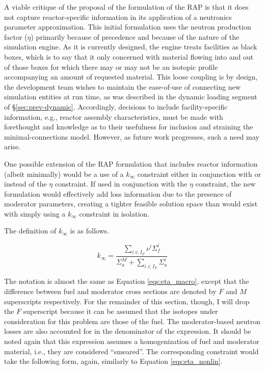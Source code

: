 A viable critique of the proposal of the formulation of the RAP is that it does
not capture reactor-specific information in its application of a neutronics
parameter approximation. This initial formulation uses the neutron production
factor ($\eta$) primarily because of precedence and because of the nature of the
\Cyclus simulation engine. As it is currently designed, the \Cyclus engine
treats facilities as black boxes, which is to say that it only concerned with
material flowing into and out of those boxes for which there may or may not be
an isotopic profile accompanying an amount of requested material. This loose
coupling is by design, the \Cyclus development team wishes to maintain the
ease-of-use of connecting new simulation entities at run time, as was described
in the dynamic loading segment of \S\ref{sec:prev-dynamic}. Accordingly,
decisions to include facility-specific information, e.g., reactor assembly
characteristics, must be made with forethought and knowledge as to their
usefulness for inclusion and straining the minimal-connections model. However,
as future work progresses, such a need may arise.

One possible extension of the RAP formulation that includes reactor information
(albeit minimally) would be a use of a $k_{\infty}$ constraint either in
conjunction with or instead of the $\eta$ constraint. If used in conjunction
with the $\eta$ constraint, the new formulation would effectively add loss
information due to the presence of moderator parameters, creating a tighter
feasible solution space than would exist with simply using a $k_{\infty}$
constraint in isolation. 

The definition of $k_{\infty}$ is as follows.

\begin{equation}\label{eqs:kinf_macro}
k_{\infty} = \frac{\sum_{i \in I_{F}} \nu^{i} \Sigma_{f}^{i}}
                  {\Sigma_{a}^{M} + \sum_{i \in I_{F}} \Sigma_{a}^{i}}
\end{equation}

The notation is almost the same as Equation \ref{eqs:eta_macro}, except that the
difference between fuel and moderator cross sections are denoted by $F$ and $M$
superscripts respectively. For the remainder of this section, though, I will
drop the $F$ superscript because it can be assumed that the isotopes under
consideration for this problem are those of the fuel. The moderator-based
neutron losses are also accounted for in the denominator of the expression. It
should be noted again that this expression assumes a homogenization of fuel and
moderator material, i.e., they are considered ``smeared''. The corresponding
constraint would take the following form, again, similarly to Equation
\ref{eqs:eta_nonlin}.

